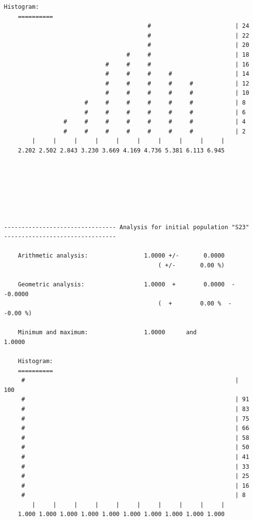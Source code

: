 \documentclass[a4paper,11pt,DIV=15,openany]{scrbook}
\begin{document}
\begin{oframed}
\begin{Verbatim}[commandchars=\\\{\}]
    Histogram:
    ==========
                                         #                        | 24
                                         #                        | 22
                                         #                        | 20
                                   #     #                        | 18
                             #     #     #                        | 16
                             #     #     #     #                  | 14
                             #     #     #     #     #            | 12
                             #     #     #     #     #            | 10
                       #     #     #     #     #     #            | 8
                       #     #     #     #     #     #            | 6
                 #     #     #     #     #     #     #            | 4
                 #     #     #     #     #     #     #            | 2
        |     |     |     |     |     |     |     |     |     |  
    2.202 2.502 2.843 3.230 3.669 4.169 4.736 5.381 6.113 6.945







-------------------------------- Analysis for initial population "S23" --------------------------------

    Arithmetic analysis:                1.0000 +/-       0.0000
                                            ( +/-       0.00 %)

    Geometric analysis:                 1.0000  +        0.0000  -       -0.0000
                                            (  +        0.00 %  -       -0.00 %)

    Minimum and maximum:                1.0000      and             1.0000

    Histogram:
    ==========
     #                                                            | 100
     #                                                            | 91
     #                                                            | 83
     #                                                            | 75
     #                                                            | 66
     #                                                            | 58
     #                                                            | 50
     #                                                            | 41
     #                                                            | 33
     #                                                            | 25
     #                                                            | 16
     #                                                            | 8
        |     |     |     |     |     |     |     |     |     |  
    1.000 1.000 1.000 1.000 1.000 1.000 1.000 1.000 1.000 1.000



\end{Verbatim}
\end{oframed}
\end{document}
